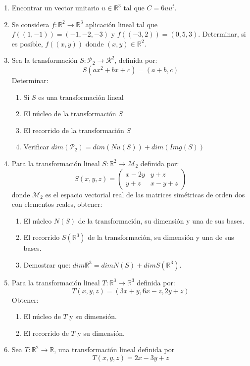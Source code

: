 \documentclass[12pt,letterpaper]{article}
\begin{document}
\begin{enumerate}
\begin{enumerate}
    \item Encontrar un vector unitario $u \in \mathbb{R}^3$ tal que $C= 6uu^t$.
  \item Se considera $f : \mathbb{R}^2\to\mathbb{R}^3$ aplicación lineal tal que $f((1,-1)) = (-1,-2,-3)$ y $f((-3, 2)) = (0, 5, 3)$. Determinar, si es posible, $f((x, y))$ donde $(x, y) \in \mathbb{R}^2$.
  \item Sea la transformación $S : \mathcal{P}_2\to\mathcal{R}^2$, definida por:
  $$
  S(ax^2 + bx + c) = (a + b,c)
  $$
  Determinar:
  \begin{enumerate}
    \item Si $S$ es una transformación lineal
    \item El núcleo de la transformación $S$
    \item El recorrido de la transformación $S$
    \item Verificar $dim(\mathcal{P}_2)= dim(Nu(S))+dim(Img(S))$
  \end{enumerate}
  \item Para la transformación lineal $S : \mathbb{R}^2\to\mathcal{M}_2$ definida por:
  $$
  S(x,y,z) = \begin{pmatrix}
    x-2y & y+z\\
    y+z & x-y+z
  \end{pmatrix}
  $$
  donde $\mathcal{M}_2$ es el espacio vectorial real de las matrices simétricas de orden dos con elementos reales, obtener:
  \begin{enumerate}
    \item El núcleo $N(S)$ de la transformación, su dimensión y una de sus bases.
    \item El recorrido $S(\mathbb{R}^3)$ de la transformación, su dimensión y una de sus bases.
    \item Demostrar que: $dim\mathbb{R}^3 = dim N(S) + dim S(\mathbb{R}^3)$.
  \end{enumerate}
  \item Para la transformación lineal $T : \mathbb{R}^3\to\mathbb{R}^3$ definida por:
  $$
  T (x, y, z) = (3x + y,6x- z,2y + z)
  $$
  Obtener:
  \begin{enumerate}
    \item El núcleo de $T$ y su dimensión.
    \item El recorrido de $T$ y su dimensión.
  \end{enumerate}
  \item Sea $T: \mathbb{R}^2\to\mathbb{R}$, una transformación lineal definida por
  $$
  T (x,y,z) = 2x -3y + z
$$
\end{enumerate}
\end{enumerate}
\end{document}
